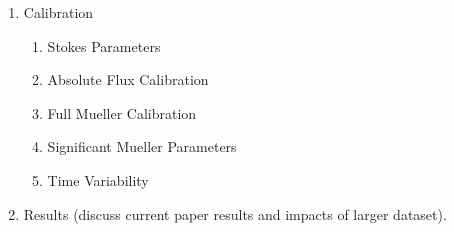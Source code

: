 \documentclass[12pt,twoside]{report}
\begin{document}
\begin{enumerate}
\begin{enumerate}
\item Calibration

\begin{enumerate}
\item Stokes Parameters
\item Absolute Flux Calibration
\item Full Mueller Calibration
\item Significant Mueller Parameters
\item Time Variability
\end{enumerate}

\item Results (discuss current paper results and impacts of larger dataset). 

\end{enumerate}

\end{enumerate}




%



%






%
\end{document}
